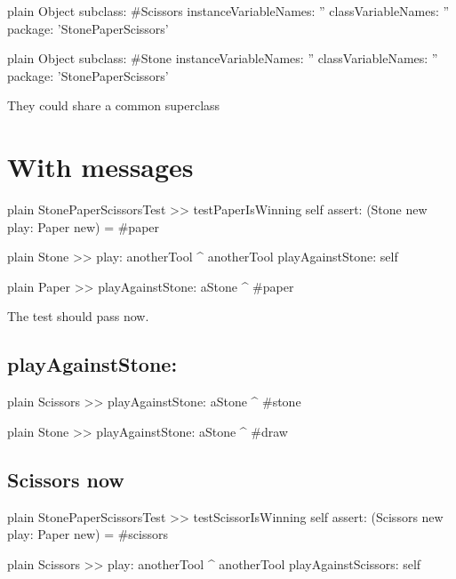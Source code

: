 \documentclass[10pt,twoside,english]{_support/latex/sbabook/sbabook}
\begin{document}
\begin{displaycode}{plain}
Object subclass: #Scissors
	instanceVariableNames: ''
	classVariableNames: ''
	package: 'StonePaperScissors'
\end{displaycode}

\begin{displaycode}{plain}
Object subclass: #Stone
	instanceVariableNames: ''
	classVariableNames: ''
	package: 'StonePaperScissors'
\end{displaycode}

They could share a common superclass
\section{With messages}
\begin{displaycode}{plain}
StonePaperScissorsTest >> testPaperIsWinning
	self assert: (Stone new play: Paper new) = #paper
\end{displaycode}

\begin{displaycode}{plain}
Stone >> play: anotherTool
	^ anotherTool playAgainstStone: self
\end{displaycode}

\begin{displaycode}{plain}
Paper >> playAgainstStone: aStone
	^ #paper
\end{displaycode}

The test should pass now. 
\subsection{playAgainstStone:}
\begin{displaycode}{plain}
Scissors >> playAgainstStone: aStone
	^ #stone
\end{displaycode}

\begin{displaycode}{plain}
Stone >> playAgainstStone: aStone
	^ #draw
\end{displaycode}
\subsection{Scissors now}
\begin{displaycode}{plain}
StonePaperScissorsTest >> testScissorIsWinning
	self assert: (Scissors new play: Paper new) = #scissors
\end{displaycode}

\begin{displaycode}{plain}
Scissors >> play: anotherTool
	^ anotherTool playAgainstScissors: self
\end{displaycode}
\end{document}
